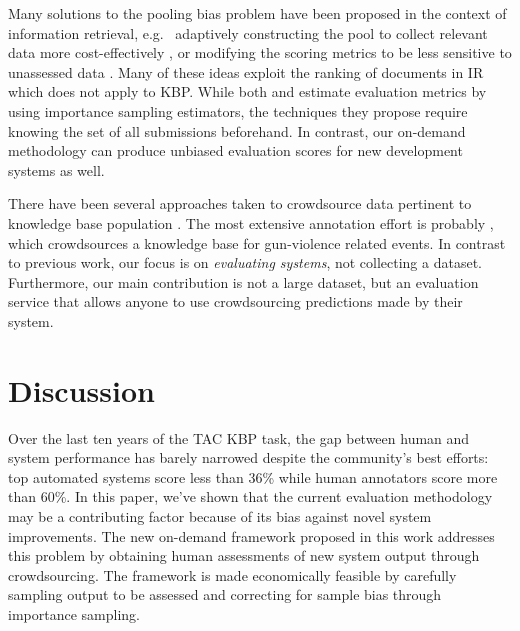 Many solutions to the pooling bias problem have been proposed in the context of information retrieval, e.g.\ 
  adaptively constructing the pool to collect relevant data more cost-effectively \citep{zobel1998reliable,cormack1998efficient,aslam2006statistical}, or
  modifying the scoring metrics to be less sensitive to unassessed data \citep{buckley2004incomplete,sakai2008information,aslam2006statistical}.
Many of these ideas exploit the ranking of documents in IR which does not apply to KBP.\@
While both \citet{aslam2006statistical} and \citet{yilmaz2008simple} estimate evaluation metrics by using importance sampling estimators, the techniques they propose require knowing the set of all submissions beforehand.
In contrast, our on-demand methodology can produce unbiased evaluation scores for new development systems as well.

There have been several approaches taken to crowdsource data pertinent to knowledge base population \citep{vannella2014validating,angeli2014combining,he2015question,liu2016effective}.
The most extensive annotation effort is probably \citet{pavlick2016gun}, which crowdsources a knowledge base for gun-violence related events.
In contrast to previous work, our focus is on \textit{evaluating systems}, not collecting a dataset.
Furthermore, our main contribution is not a large dataset, but an evaluation service that allows anyone to use crowdsourcing predictions made by their system. 

\section{Discussion}
\label{sec:kbpo:discussion}

Over the last ten years of the TAC KBP task, the gap between human and system performance has barely narrowed despite the community's best efforts: top automated systems score less than 36\% \fone{} while human annotators score more than 60\%.
In this paper, we've shown that the current evaluation methodology may be a contributing factor because of its bias against novel system improvements.
The new on-demand framework proposed in this work addresses this problem by obtaining human assessments of new system output through crowdsourcing.
The framework is made economically feasible by carefully sampling output to be assessed and correcting for sample bias through importance sampling.

